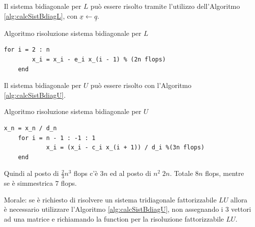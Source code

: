 \noindent Il sistema bidiagonale per $L$ può essere risolto tramite l'utilizzo dell'Algoritmo \ref{alg:calcSistBdiagL}, con $\underline{x}\leftarrow\underline{q}$.

\begin{algorithm}\caption{Algoritmo risoluzione sistema bidiagonale per $L$}
\label{alg:calcSistBdiagL}
    \begin{lstlisting}[style=Matlab-editor]
    for i = 2 : n
        x_i = x_i - e_i x_(i - 1) % (2n flops)
    end
    \end{lstlisting}
\end{algorithm}

\noindent Il sistema bidiagonale per $U$ può essere risolto con l'Algoritmo \ref{alg:calcSistBdiagU}.
\begin{algorithm}\caption{Algoritmo risoluzione sistema bidiagonale per $U$}
\label{alg:calcSistBdiagU}
    \begin{lstlisting}[style=Matlab-editor]
    x_n = x_n / d_n
    for i = n - 1 : -1 : 1
            x_i = (x_i - c_i x_(i + 1)) / d_i %(3n flops)
    end
    \end{lstlisting}
\end{algorithm}

\noindent Quindi al posto di $\frac{2}{3}n^3$ flops c'è $3n$ ed al posto di $n^2\; 2n$. Totale $8n$ flops, mentre se è simmestrica $7$ flops.

\noindent Morale: se è richiesto di risolvere un sistema tridiagonale fattorizzabile $LU$ allora è necessario utilizzare l'Algoritmo \ref{alg:calcSistBdiagU}, non assegnando i 3 vettori ad una matrice e richiamando la function per la risoluzione fattorizzabile $LU$.